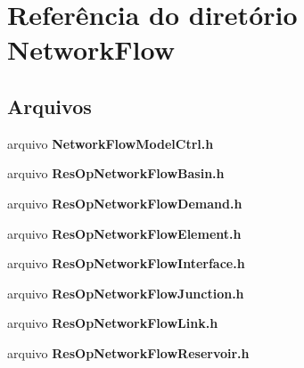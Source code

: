 \section{Referência do diretório Network\+Flow}
\label{dir_1ce92e10e4887469e78ec25ad897722d}
\subsection*{Arquivos}
\begin{DoxyCompactItemize}
\item 
arquivo {\bf Network\+Flow\+Model\+Ctrl.\+h}
\item 
arquivo {\bf Res\+Op\+Network\+Flow\+Basin.\+h}
\item 
arquivo {\bf Res\+Op\+Network\+Flow\+Demand.\+h}
\item 
arquivo {\bf Res\+Op\+Network\+Flow\+Element.\+h}
\item 
arquivo {\bf Res\+Op\+Network\+Flow\+Interface.\+h}
\item 
arquivo {\bf Res\+Op\+Network\+Flow\+Junction.\+h}
\item 
arquivo {\bf Res\+Op\+Network\+Flow\+Link.\+h}
\item 
arquivo {\bf Res\+Op\+Network\+Flow\+Reservoir.\+h}
\end{DoxyCompactItemize}
